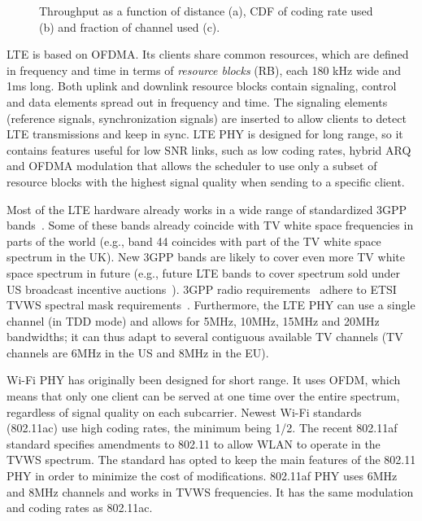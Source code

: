 \begin{figure}[t]
\begin{minipage}{0.32\textwidth}
  \end{minipage}
 \caption{Throughput as a function of distance (a), CDF of coding rate used (b) and fraction of channel used (c).}
  \label{fig:phy}
\vskip -6pt
\end{figure}


LTE is based on OFDMA. Its clients share common resources, which are defined in frequency and time in terms of \emph{resource blocks} (RB), each 180 kHz wide and 1ms long. 
Both uplink and downlink resource blocks contain signaling, control and data elements spread out in frequency and time. 
The signaling elements (reference signals, synchronization signals) are inserted to allow clients to detect LTE transmissions and keep in sync. 
LTE PHY is designed for long range, so it contains features useful for low SNR links, such as low coding rates, hybrid ARQ and OFDMA modulation that allows 
the scheduler to use only a subset of resource blocks with the highest signal quality when sending to a specific client.

Most of the LTE hardware already works in a wide range of standardized 3GPP bands~\cite{36_101}. Some of these bands already coincide with TV white space frequencies in parts of the world (e.g., band 44 coincides with part of the TV white space spectrum in the UK). New 3GPP bands are likely to cover even more TV white space spectrum in future (e.g., future LTE bands to cover spectrum sold under US broadcast incentive auctions~\cite{fcc_600}). 
3GPP radio requirements~\cite{36_101, 36_104} adhere to ETSI TVWS spectral mask requirements~\cite{etsi_tvws}. 
Furthermore, the LTE PHY can use a single channel (in TDD mode) and allows for 5MHz, 10MHz, 15MHz and 20MHz bandwidths; it can thus adapt to several contiguous available TV channels (TV channels are 6MHz in the US and 8MHz in the EU). 

Wi-Fi PHY has originally been designed for short range. It uses OFDM, which means that only one client can be served at one time over the entire spectrum, regardless of signal quality on each subcarrier. Newest Wi-Fi standards (802.11ac) use high coding rates, the minimum being 1/2. 
The recent 802.11af~\cite{Rice_af} standard specifies amendments to 802.11 to allow WLAN to operate in the TVWS spectrum. The standard has opted to keep the main features of the 802.11 PHY in order to minimize the cost of modifications. 802.11af PHY uses 6MHz and 8MHz channels and works in TVWS frequencies. It has the same modulation and coding rates as 802.11ac. 

